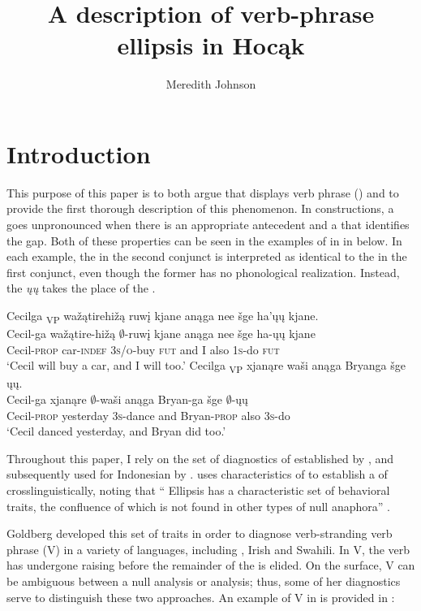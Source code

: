 \documentclass[output=paper]{LSP/langsci}
\author{Meredith Johnson}
\title{A description of verb-phrase ellipsis in {Hocąk}}
\begin{document}
\section{Introduction}\label{sec:johnson:1}

This purpose of this paper is to both argue that  displays verb phrase  () and to provide the first thorough description of this phenomenon. In  constructions, a  goes unpronounced when there is an appropriate antecedent  and a  that identifies the gap. Both of these properties can be seen in the examples of  in  in  below. In each example, the  in the second conjunct is interpreted as identical to the  in the first conjunct, even though the former has no phonological realization. Instead, the  \emph{ųų} takes the place of the .


\ea\label{ex:johnson:1}
\ea
\glll Cecilga {\ob}\textsubscript{VP} wažątirehižą ruwį{\cb} kjane anąga nee šge {\ob}ha'ųų{\cb} kjane.\\
Cecil-ga {} wažątire-hižą {$\emptyset$}-ruwį kjane anąga nee šge ha-ųų kjane\\
Cecil-\textsc{prop} {} car-\textsc{indef} \textsc{3s/o}-buy \textsc{fut} and I also \textsc{1s}-do \textsc{fut}\\
\trans `Cecil will buy a car, and I will too.' 
\ex
\glll Cecilga {\ob}\textsubscript{VP} xjanąre waši{\cb} anąga Bryanga šge {\ob}ųų{\cb}.\\
Cecil-ga {} xjanąre {$\emptyset$}-waši anąga Bryan-ga šge {$\emptyset$}-ųų\\
Cecil-\textsc{prop} {} yesterday \textsc{3s}-dance and Bryan-\textsc{prop} also \textsc{3s}-do\\
\trans `Cecil danced yesterday, and Bryan did too.'
\z
\z

Throughout this paper, I rely on the set of diagnostics of  established by \citet{Goldberg2005}, and subsequently used for Indonesian by \citet{Fortin2007}. \citet{Goldberg2005} uses characteristics of   to establish a  of  crosslinguistically, noting that ``  Ellipsis has a characteristic set of behavioral traits, the confluence of which is not found in other types of null anaphora'' \citep[27]{Goldberg2005}. 

Goldberg developed this set of traits in order to diagnose verb-stranding verb phrase  (V) in a variety of languages, including , Irish and Swahili. In V, the verb has undergone raising before the remainder of the  is elided. On the surface, V can be ambiguous between a null  analysis or  analysis; thus, some of her diagnostics serve to distinguish these two approaches. An example of V in  is provided in :
 
\end{document}

